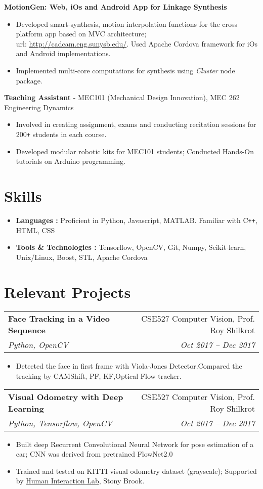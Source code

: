 \documentclass[letterpaper,10pt]{article}
\makeatletter
\newcommand{\resumeHeading}[4]{
  \vspace{-1pt}
    \begin{tabular*}{0.97\textwidth}{l@{\extracolsep{\fill}}r}
      \textbf{#1} & #2 \vspace{-2pt}\\ \vspace{1pt}
      \textit{\small#3} & \textit{\small #4} \\
    \end{tabular*}
}
\newcommand{\resumeSubheading}[1]{
      {\small\textbf{#1}} \\
}
\newcommand{\resumeSubheadingNew}[1]{
      {\small{#1}} \\
}
\newcommand{\resumeSection}[1]{
\vspace{-12pt}
\section{\textbf{#1}}
}
\newcommand{\resumeItemListStart}{
\vspace{-7pt}
\begin{itemize}[leftmargin=14pt]
}
\newcommand{\resumeItemListEnd}{
\vspace{+7pt}
\end{itemize}
}
\newcommand{\resumeItem}[1]{
  \item\small{
      {#1 \vspace{-7pt}
      }
  }
}
\makeatother
\begin{document}
      \vspace{-5pt}
      \resumeSubheading{MotionGen: Web, iOs and Android App for Linkage Synthesis}
      \resumeItemListStart
        \resumeItem{Developed smart-synthesis, motion interpolation functions for the cross platform app based on MVC architecture; \\ url: \href{http://cadcam.eng.sunysb.edu/}{http://cadcam.eng.sunysb.edu/}. Used Apache Cordova framework for iOs and Android implementations.}
        \resumeItem{Implemented multi-core computations for synthesis using \emph{Cluster} node package.}
      \resumeItemListEnd

      \vspace{-5pt}
      \resumeSubheadingNew{\textbf{Teaching Assistant} - MEC101 (Mechanical Design Innovation), MEC 262 Engineering Dynamics}
      \resumeItemListStart
        \resumeItem{Involved in creating assignment, exams and conducting recitation sessions for 200\texttt{+} students in each course.}
        \resumeItem{Developed modular robotic kits for MEC101 students; Conducted Hands-On tutorials on Arduino programming.}
      \resumeItemListEnd

\resumeSection{Skills}
\vspace{+7pt}
    \resumeItemListStart
      \resumeItem{\textbf{Languages :} Proficient in Python, Javascript, MATLAB. Familiar with C\texttt{++}, HTML, CSS}
      \resumeItem{\textbf{Tools \& Technologies :} Tensorflow, OpenCV, Git, Numpy, Scikit-learn, Unix/Linux, Boost, STL, Apache Cordova}
    \resumeItemListEnd


    \resumeSection{Relevant Projects}
        \resumeHeading{Face Tracking in a Video Sequence}{CSE527 Computer Vision, Prof. Roy Shilkrot} {Python, OpenCV}{Oct 2017 -- Dec 2017}
        \resumeItemListStart
          \resumeItem{Detected the face in first frame with Viola-Jones Detector.Compared the tracking by CAMShift, PF, KF,Optical Flow tracker.}
        \resumeItemListEnd
    \vspace{-10pt}

    \resumeHeading{Visual Odometry with Deep Learning}{CSE527 Computer Vision, Prof. Roy Shilkrot} {Python, Tensorflow, OpenCV}{Oct 2017 -- Dec 2017}
    \resumeItemListStart
      \resumeItem{Built deep Recurrent Convolutional Neural Network for pose estimation of a car; CNN was derived from pretrained FlowNet2.0}
      \resumeItem{Trained and tested on KITTI visual odometry dataset (grayscale); Supported by \href{http://hi.cs.stonybrook.edu/}{Human Interaction Lab}, Stony Brook.}
    \resumeItemListEnd
\end{document}

